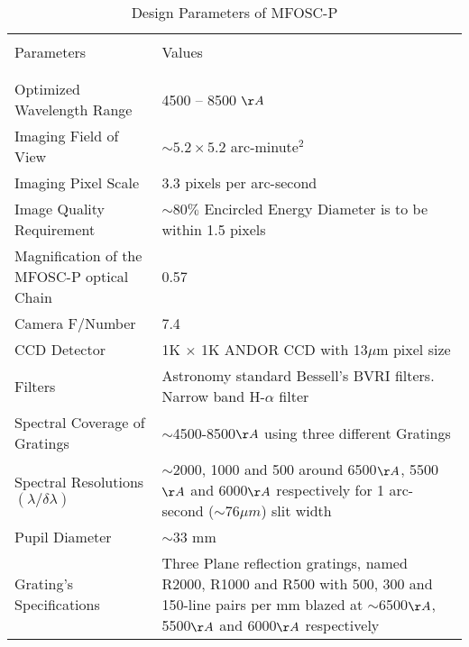 \begin{table*}
	\centering
	\caption{Design Parameters of MFOSC-P}
	\begin{tabular}{p{5cm}p{5cm}}
		\hline
		\hline
		&          \\
		Parameters &	Values \\
		&          \\
		\hline
		\hline 
		&           \\
		Optimized Wavelength Range &	4500 – 8500 $\AA$ \\		
		Imaging Field of View &	$\sim5.2 \times 5.2$ arc-minute$^2$ \\
		Imaging Pixel Scale	& 3.3 pixels per arc-second \\
		Image Quality Requirement  &	$\sim80\%$ Encircled Energy Diameter is to be within 1.5 pixels \\
		Magnification of the MFOSC-P optical Chain &	0.57  \\
		Camera F/Number	& 7.4 \\
		CCD Detector	& 1K $\times$ 1K ANDOR CCD with 13$\mu$m pixel size \\
		Filters &	Astronomy standard Bessell’s BVRI filters. Narrow band H-$\alpha$ filter \\		Spectral Coverage of Gratings &	$\sim$4500-8500$\AA$ using three different Gratings \\
		Spectral Resolutions $(\lambda/\delta\lambda)$ &	$\sim$2000, 1000 and 500 around 6500$\AA$, 5500$\AA$ and 6000$\AA$ respectively for 1 arc-second ($\sim76\mu m$) slit width \\
		Pupil Diameter & $\sim$33 mm \\
		Grating’s Specifications & Three Plane reflection gratings, named R2000, R1000 and R500 with 500, 300 and 150-line pairs per mm blazed at $\sim$6500$\AA$, 5500$\AA$ and 6000$\AA$ respectively \\ 
		
		\hline		
		\hline
		
	\end{tabular}
	\label{table-para}	
\end{table*}

